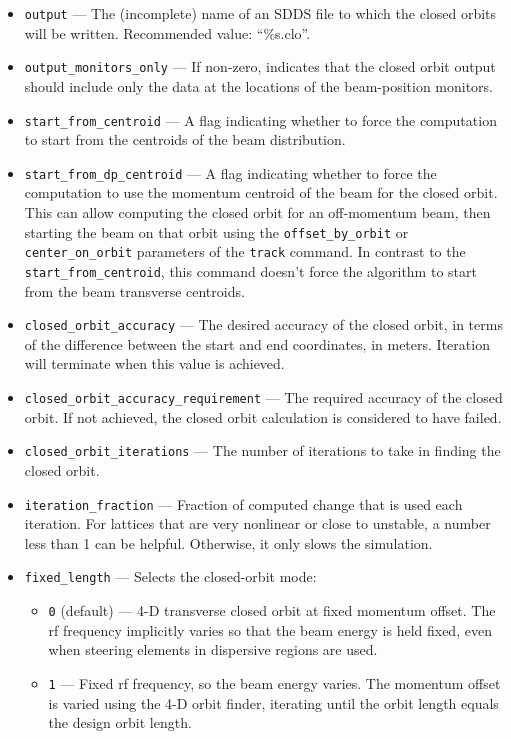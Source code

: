 \documentclass[11pt]{article}
\begin{document}
\begin{itemize}
\item \verb|output| --- The (incomplete) name of an SDDS file to which
the closed orbits will be written.  Recommended value: ``\%s.clo''.
\item \verb|output_monitors_only| --- If non-zero, indicates that the
closed orbit output should include only the data at the locations of
the beam-position monitors.
\item \verb|start_from_centroid| --- A flag indicating whether to
force the computation to start from the centroids of the beam
distribution.
\item \verb|start_from_dp_centroid| --- A flag indicating whether to 
force the computation to use the momentum centroid of the beam 
for the closed orbit.  This can allow computing the closed orbit
for an off-momentum beam, then starting the beam on that orbit
using the \verb|offset_by_orbit| or \verb|center_on_orbit| parameters
of the \verb|track| command.  In contrast to the \verb|start_from_centroid|,
this command doesn't force the algorithm to start from the beam
transverse centroids.
\item \verb|closed_orbit_accuracy| --- The desired accuracy of the
closed orbit, in terms of the difference between the start and end
coordinates, in meters. Iteration will terminate when this value is achieved.
\item \verb|closed_orbit_accuracy_requirement| --- The required accuracy of the
closed orbit. If not achieved, the closed orbit calculation is considered to 
have failed.
\item \verb|closed_orbit_iterations| --- The number of iterations to
take in finding the closed orbit.
\item \verb|iteration_fraction| --- Fraction of computed change that
is used each iteration.  For lattices that are very nonlinear or close
to unstable, a number less than 1 can be helpful.  Otherwise, it only
slows the simulation.
\item \verb|fixed_length| --- Selects the closed-orbit mode:
\begin{itemize}
\item \verb|0| (default) --- 4-D transverse closed orbit at fixed momentum offset. The rf
  frequency implicitly varies so that the beam energy is held fixed, even when steering elements
  in dispersive regions are used.
\item \verb|1| --- Fixed rf frequency, so the beam energy varies. The momentum offset is varied
  using the 4-D orbit finder, iterating until the orbit length equals the design orbit length.

\end{itemize}
\end{itemize}
\end{document}
